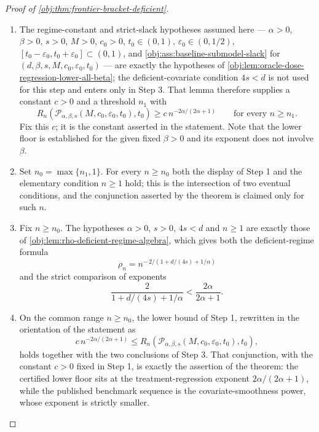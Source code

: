 \documentclass[11pt]{article}
\begin{document}
\begin{proof}[Proof of \cref{obj:thm:frontier-bracket-deficient}]
\begin{enumerate}
\item The regime-constant and strict-slack hypotheses assumed here — \(\alpha>0\), \(\beta>0\),
\(s>0\), \(M>0\), \(c_0>0\), \(t_0\in(0,1)\), \(\varepsilon_0\in(0,1/2)\),
\([t_0-\varepsilon_0,t_0+\varepsilon_0]\subset(0,1)\), and \cref{obj:ass:baseline-submodel-slack}
for \((d,\beta,s,M,c_0,\varepsilon_0,t_0)\) — are exactly the hypotheses of
\cref{obj:lem:oracle-dose-regression-lower-all-beta}; the deficient-covariate condition \(4s<d\) is
not used for this step and enters only in Step 3. That lemma therefore supplies a constant \(c>0\)
and a threshold \(n_1\) with
\[
R_n\!\left(\mathcal P_{\alpha,\beta,s}(M,c_0,\varepsilon_0,t_0),t_0\right)
\ge
c\,n^{-2\alpha/(2\alpha+1)}
\qquad\text{for every }n\ge n_1 .
\]
Fix this \(c\); it is the constant asserted in the statement. Note that the lower floor is
established for the given fixed \(\beta>0\) and its exponent does not involve \(\beta\).

\item Set \(n_0=\max\{n_1,1\}\). For every \(n\ge n_0\) both the display of Step 1 and the
elementary condition \(n\ge1\) hold; this is the intersection of two eventual conditions, and the
conjunction asserted by the theorem is claimed only for such \(n\).

\item Fix \(n\ge n_0\). The hypotheses \(\alpha>0\), \(s>0\), \(4s<d\) and \(n\ge1\) are exactly
those of \cref{obj:lem:rho-deficient-regime-algebra}, which gives both the deficient-regime formula
\[
\rho_n
=
n^{-\,2/(1+d/(4s)+1/\alpha)}
\]
and the strict comparison of exponents
\[
\frac{2}{1+d/(4s)+1/\alpha}
<
\frac{2\alpha}{2\alpha+1}.
\]

\item On the common range \(n\ge n_0\), the lower bound of Step 1, rewritten in the orientation of
the statement as
\[
c\,n^{-2\alpha/(2\alpha+1)}
\le
R_n\!\left(
\mathcal P_{\alpha,\beta,s}(M,c_0,\varepsilon_0,t_0),t_0
\right),
\]
holds together with the two conclusions of Step 3. That conjunction, with the constant \(c>0\) fixed
in Step 1, is exactly the assertion of the theorem: the certified lower floor sits at the
treatment-regression exponent \(2\alpha/(2\alpha+1)\), while the published benchmark sequence is the
covariate-smoothness power, whose exponent is strictly smaller.
\end{enumerate}
\end{proof}




\end{document}
